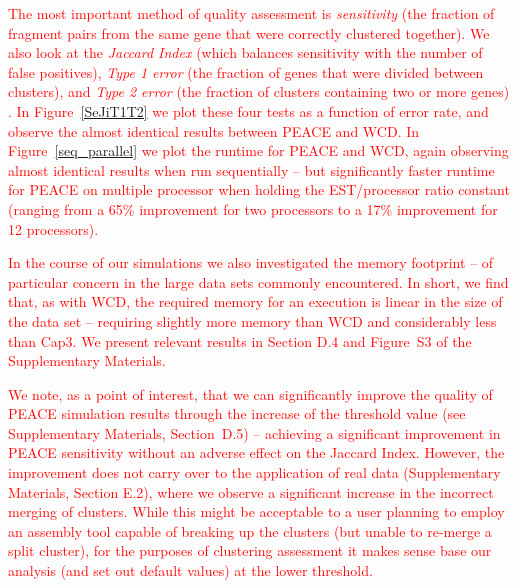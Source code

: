 \documentclass[a4,center,fleqn]{NAR}
\newcommand{\mc}[1]{\textcolor{red}{#1}}
\newcommand{\peace} {{\small PEACE}}
\newcommand{\wcd} {{\small WCD}}
\newcommand{\capthree} {{\small Cap3}}
\begin{document}
\mc{The most important method of quality assessment is {\it
    sensitivity} (the fraction of fragment pairs from the same gene
  that were} \mc{correctly clustered together).  We also look at the
  {\it Jaccard Index} (which balances sensitivity with the number of
  false positives), {\it Type 1 error} (the fraction of genes that
  were divided between clusters), and {\it Type 2 error} (the fraction
  of clusters containing two or more genes)
  \cite{Hazelhurst08a,Wang04}.  In Figure~\ref{SeJiT1T2} we plot these
  four tests as a function of error rate, and observe the almost
  identical results between \peace\/ and \wcd\/.  In
  Figure~\ref{seq_parallel} we plot the runtime for \peace\/ and
  \wcd\/, again observing almost identical results when run
  sequentially -- but significantly faster runtime for PEACE on
  multiple processor when holding the EST/processor ratio constant
  (ranging from a 65\% improvement for two processors to a 17\%
  improvement for 12 processors).}

\mc{In the course of our simulations we also investigated the memory
  footprint -- of particular concern in the large data sets commonly
  encountered.  In short, we find that, as with \wcd, the required
  memory for an execution is linear in the size of the data set --
  requiring slightly more memory than \wcd\/ and considerably less
  than \capthree.  We present relevant results in Section D.4 and
  Figure~S3 of the Supplementary Materials.}

\mc{We note, as a point of interest, that we can significantly improve
  the quality of \peace\/} \mc{simulation} \mc{results} \mc{through} \mc{the} \mc{increase} \mc{of}
  \mc{the} \mc{threshold} \mc{value} \mc{(see} \mc{Supplementary} \mc{Materials,} \mc{Section~D.5) --}
  \mc{achieving} \mc{a} \mc{significant} \mc{improvement} \mc{in PEACE sensitivity without an
  adverse effect on the Jaccard Index.  However, the improvement does
  not carry over to the application of real data (Supplementary
  Materials, Section E.2), where we observe a significant increase in
  the incorrect merging of clusters.  While this might be acceptable
  to a user planning to employ an assembly tool capable of breaking
  up the clusters (but unable to re-merge a split cluster), for the
  purposes of clustering assessment it makes sense base our analysis (and
  set out default values) at the lower threshold.}
\end{document}
